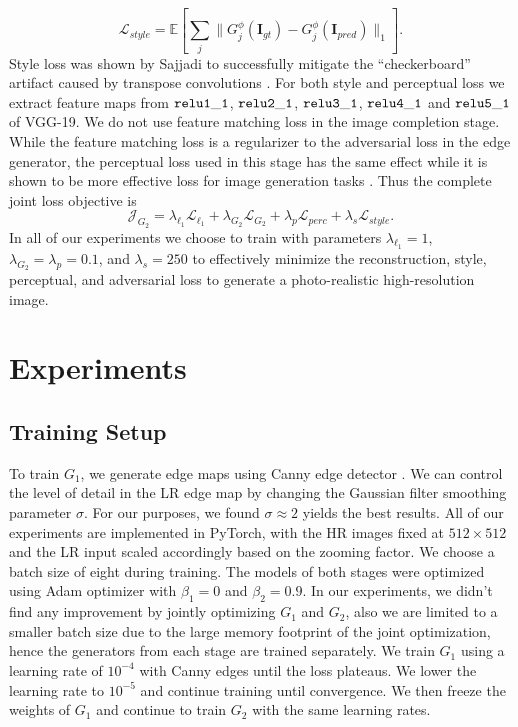 \documentclass[10pt,twocolumn,letterpaper]{article}
\begin{document}
\begin{equation}
    \mathcal{L}_{style} = \mathbb{E} \left[ \sum_{j} \lVert G_j^{\phi} (\mathbf{I}_{gt}) - G_j^{\phi} (\mathbf{I}_{pred}) \rVert_1 \right].
\end{equation}
Style loss was shown by Sajjadi \etal \cite{sajjadi2017enhancenet} to successfully mitigate the ``checkerboard'' artifact caused by transpose convolutions \cite{odena2016deconvolution}. For both style and perceptual loss we extract feature maps from $\tt{relu1\_1}$, $\tt{relu2\_1}$, $\tt{relu3\_1}$, $\tt{relu4\_1}$ and $\tt{relu5\_1}$ of VGG-19. We do not use feature matching loss in the image completion stage. While the feature matching loss is a regularizer to the adversarial loss in the edge generator, the perceptual loss used in this stage has the same effect while it is shown to be more effective loss for image generation tasks \cite{nazeri2019edgeconnect,sajjadi2017enhancenet,johnson2016perceptual,johnson2016perceptual}. Thus the complete joint loss objective is  
\begin{equation}
	\mathcal{J}_{G_2} = \lambda_{\ell_1} \mathcal{L}_{\ell_1} + \lambda_{G_2} \mathcal{L}_{G_2} + \lambda_p \mathcal{L}_{perc} + \lambda_s \mathcal{L}_{style}.
	\label{eq:g2}
\end{equation}
In all of our experiments we choose to train with parameters $\lambda_{\ell_1} = 1$, $\lambda_{G_2} = \lambda_p = 0.1$, and $\lambda_s = 250$ to effectively minimize the reconstruction, style, perceptual, and adversarial loss to generate a photo-realistic high-resolution image.

\section{Experiments}
\subsection{Training Setup}
To train $G_1$, we generate edge maps using Canny edge detector \cite{canny1986computational}. We can control the level of detail in the LR edge map by changing the Gaussian filter smoothing parameter $\sigma$. For our purposes, we found $\sigma \approx 2$ yields the best results. All of our experiments are implemented in PyTorch, with the HR images fixed at $512\times512$ and the LR input scaled accordingly based on the zooming factor. We choose a batch size of eight during training. The models of both stages were optimized using Adam optimizer \cite{kingma2014adam} with $\beta_1 = 0$ and $\beta_2 = 0.9$. In our experiments, we didn't find any improvement by jointly optimizing $G_1$ and $G_2$, also we are limited to a smaller batch size due to the large memory footprint of the joint optimization, hence the generators from each stage are trained separately. We train $G_1$ using a learning rate of $10^{-4}$ with Canny edges until the loss plateaus. We lower the learning rate to $10^{-5}$ and continue training until convergence. We then freeze the weights of $G_1$ and continue to train $G_2$ with the same learning rates.
\end{document}

